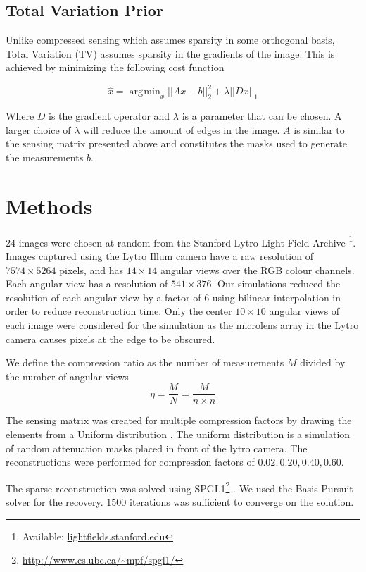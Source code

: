\documentclass[10pt,twocolumn,letterpaper]{article}
\DeclareMathOperator*{\argmin}{\arg\!\min}
\begin{document}
\subsection{Total Variation Prior}

Unlike compressed sensing which assumes sparsity in some orthogonal basis, Total Variation (TV) assumes sparsity in the gradients of the image. This is achieved by minimizing the following cost function

\[ \hat{x} = \argmin_x ||Ax - b||^2_2 + \lambda ||D x||_1 \]

Where $D$ is the gradient operator and $\lambda$ is a parameter that can be chosen. A larger choice of $\lambda$ will reduce the amount of edges in the image. $A$ is similar to the sensing matrix presented above and constitutes the masks used to generate the measurements $b$.

\section{Methods}


24 images were chosen at random from the Stanford Lytro Light Field Archive \footnote{Available: \url{lightfields.stanford.edu}}. Images captured using the Lytro Illum camera have a raw resolution of $7574 \times 5264$ pixels, and has $14 \times 14$ angular views over the RGB colour channels. Each angular view has a resolution of $541 \times 376$. Our simulations reduced the resolution of each angular view by a factor of $6$ using bilinear interpolation in order to reduce reconstruction time. Only the center $10 \times 10$ angular views of each image were considered for the simulation as the microlens array in the Lytro camera causes pixels at the edge to be obscured.


We define the compression ratio as the number of measurements $M$ divided by the number of angular views \[ \eta = \frac{M}{N} = \frac{M}{n \times n}\]

The sensing matrix was created for multiple compression factors by drawing the elements from a Uniform distribution \cite{Rauhut11}. The uniform distribution is a simulation of random attenuation masks placed in front of the lytro camera. The reconstructions were performed for compression factors of $0.02, 0.20, 0.40, 0.60$.

The sparse reconstruction was solved using SPGL1\footnote{\url{http://www.cs.ubc.ca/~mpf/spgl1/}} \cite{BasisPursuit1}\cite{BasisPursuit2}. We used the Basis Pursuit solver for the recovery. $1500$ iterations was sufficient to converge on the solution.
\end{document}
